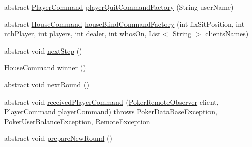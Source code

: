 \begin{DoxyCompactItemize}
\item 
abstract \hyperlink{classhu_1_1elte_1_1bfw1p6_1_1poker_1_1command_1_1_player_command}{Player\+Command} \hyperlink{classhu_1_1elte_1_1bfw1p6_1_1poker_1_1server_1_1_abstract_poker_table_server_aef2da6127369d8ab41407bc62b3e5fb0}{player\+Quit\+Command\+Factory} (String user\+Name)
\item 
abstract \hyperlink{classhu_1_1elte_1_1bfw1p6_1_1poker_1_1command_1_1_house_command}{House\+Command} \hyperlink{classhu_1_1elte_1_1bfw1p6_1_1poker_1_1server_1_1_abstract_poker_table_server_a36b34f5e1ca57e29a6f6616c6bd2ebca}{house\+Blind\+Command\+Factory} (int fix\+Sit\+Position, int nth\+Player, int \hyperlink{classhu_1_1elte_1_1bfw1p6_1_1poker_1_1server_1_1_abstract_poker_table_server_af656d24ed8430f64a2977256c117e455}{players}, int \hyperlink{classhu_1_1elte_1_1bfw1p6_1_1poker_1_1server_1_1_abstract_poker_table_server_a751c5c3e6848998d8169e705797962fc}{dealer}, int \hyperlink{classhu_1_1elte_1_1bfw1p6_1_1poker_1_1server_1_1_abstract_poker_table_server_ac4b4b5f5ec9dfa6337b54008362895a9}{whos\+On}, List$<$ String $>$ \hyperlink{classhu_1_1elte_1_1bfw1p6_1_1poker_1_1server_1_1_abstract_poker_table_server_ac28737f9878e026f6035430b64dcb6bd}{clients\+Names})
\item 
abstract void \hyperlink{classhu_1_1elte_1_1bfw1p6_1_1poker_1_1server_1_1_abstract_poker_table_server_a2aa1fe30856230c00263daf15e0efa7a}{next\+Step} ()
\item 
\hyperlink{classhu_1_1elte_1_1bfw1p6_1_1poker_1_1command_1_1_house_command}{House\+Command} \hyperlink{classhu_1_1elte_1_1bfw1p6_1_1poker_1_1server_1_1_abstract_poker_table_server_aeb7d19b10b768340a86884ce27cb2d92}{winner} ()
\item 
abstract void \hyperlink{classhu_1_1elte_1_1bfw1p6_1_1poker_1_1server_1_1_abstract_poker_table_server_a16b65042d13c9c154893c40be21a828f}{next\+Round} ()
\item 
abstract void \hyperlink{classhu_1_1elte_1_1bfw1p6_1_1poker_1_1server_1_1_abstract_poker_table_server_a3743ee2cd27c555ad5ac3c88d1e6c88e}{received\+Player\+Command} (\hyperlink{interfacehu_1_1elte_1_1bfw1p6_1_1poker_1_1client_1_1observer_1_1_poker_remote_observer}{Poker\+Remote\+Observer} client, \hyperlink{classhu_1_1elte_1_1bfw1p6_1_1poker_1_1command_1_1_player_command}{Player\+Command} player\+Command)  throws Poker\+Data\+Base\+Exception, Poker\+User\+Balance\+Exception, Remote\+Exception
\item 
abstract void \hyperlink{classhu_1_1elte_1_1bfw1p6_1_1poker_1_1server_1_1_abstract_poker_table_server_abcd54bfa4e646c0d5db4248b8a01f016}{prepare\+New\+Round} ()

\end{DoxyCompactItemize}
